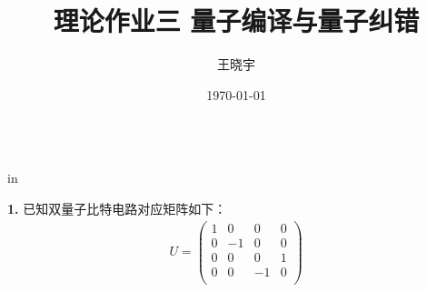 \documentclass[11pt]{article}
\begin{document}
\title{{\bf 理论作业三 \quad 量子编译与量子纠错}}
\author{王晓宇 }
\date{\today}
\maketitle

\begin{tabular*}{13cm}{r}
\hline
\end{tabular*}

 in

{\bf 1.} 已知双量子比特电路对应矩阵如下：
\begin{align*}
    U = \begin{pmatrix}
    1 & 0 & 0 & 0 \\
    0 & -1 & 0 & 0 \\
    0 & 0 & 0 & 1 \\
    0 & 0 & -1 & 0 \\
    \end{pmatrix}
\end{align*}
\end{document}
